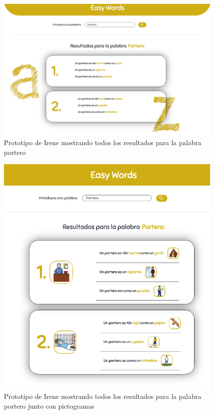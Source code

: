 \begin{figure}[!t]
	\includegraphics[width=.8\textwidth]{Imagenes/Bitmap/Mockups/mockup3_irene_inicial.png}
	\centering
	\caption{Prototipo de Irene mostrando todos los resultados para la palabra portero}
	\label{fig:mockup3irene_vInicial}
\end{figure}

\begin{figure}[!t]
	\includegraphics[width=.8\textwidth]{Imagenes/Bitmap/Mockups/mockup4_irene_inicial.png}
	\centering
	\caption{Prototipo de Irene mostrando todos los resultados para la palabra portero junto con pictogramas}
	\label{fig:mockup4irene_vInicial}
\end{figure}

